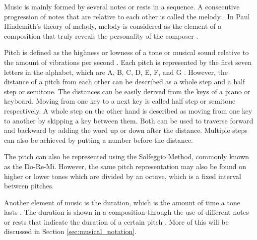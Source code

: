 
Music is mainly formed by several notes or rests in a sequence. A consecutive progression of notes that are relative to each other is called the melody \citep{rivadelo1986fundamentals}. In Paul Hindemith’s theory of melody, melody is considered as the element of a composition that truly reveals the personality of the composer \citep{cheng2016approaching}. 

Pitch is defined as the highness or lowness of a tone or musical sound relative to the amount of vibrations per second \citep{rivadelo1986fundamentals}. Each pitch is represented by the first seven letters in the alphabet, which are A, B, C, D, E, F, and G \citep{miller2005complete}. However, the distance of a pitch from each other can be described as a whole step and a half step or semitone. The distances can be easily derived from the keys of a piano or keyboard. Moving from one key to a next key is called half step or semitone respectively. A whole step on the other hand is described as moving from one key to another by skipping a key between them. Both can be used to traverse forward and backward by adding the word up or down after the distance. Multiple steps can also be achieved by putting a number before the distance.

The pitch can also be represented using the Solfeggio Method, commonly known as the Do-Re-Mi. However, the same pitch representation may also be found on higher or lower tones which are divided by an octave, which is a fixed interval between pitches.

Another element of music is the duration, which is the amount of time a tone lasts \citep{rivadelo1986fundamentals}. The duration is shown in a composition through the use of different notes or rests that indicate the duration of a certain pitch \citep{rivadelo1986fundamentals, burrows1999reading}. More of this will be discussed in Section \ref{sec:musical_notation}.


